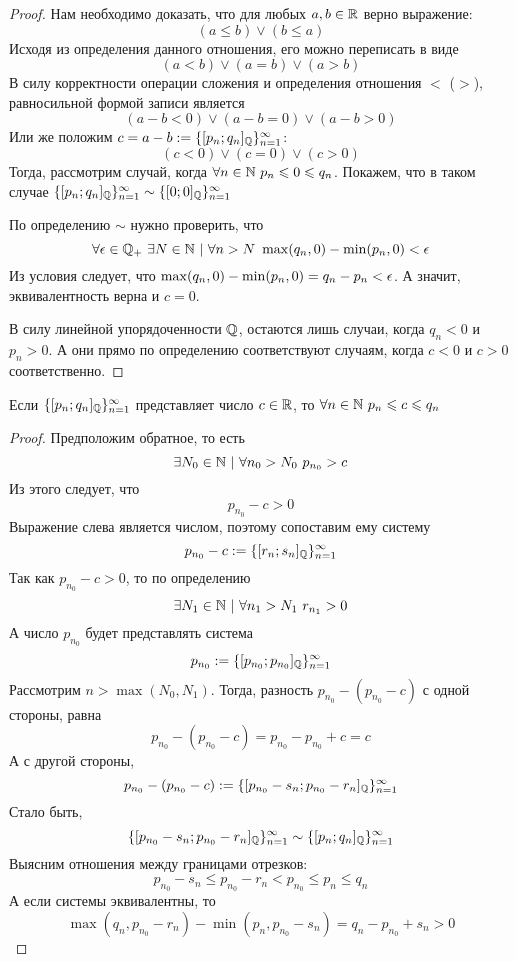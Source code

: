 \begin{proof}
    Нам необходимо доказать, что для любых $a, b \in \mathbb{R}$ верно выражение:
    $$
        (a \le b) \vee (b \le a)
    $$
    Исходя из определения данного отношения, его можно переписать в виде
    $$
        (a < b) \vee (a = b) \vee (a > b)
    $$
    В силу корректности операции сложения и определения отношения $<$ ($>$), равносильной формой записи является
    $$
        (a - b < 0) \vee (a - b = 0) \vee (a - b > 0)
    $$
    Или же положим $c = a - b := \{[p_n; q_n]_{\mathbb{Q}}\}_{n = 1}^\infty$:
    $$
        (c < 0) \vee (c = 0) \vee (c > 0)
    $$
    Тогда, рассмотрим случай, когда $\forall n \in \mathbb{N}\ p_n \leqslant 0 \leqslant q_n$.
    Покажем, что в таком случае $\{[p_n;q_n]_{\mathbb{Q}}\}_{n = 1}^\infty \sim \{[0;0]_{\mathbb{Q}}\}_{n = 1}^\infty$
    
    По определению $\sim$ нужно проверить, что
    $$
        \forall \epsilon \in \mathbb{Q}_+\ \exists N \in \mathbb{N}\ |\ \forall n > N\ \max(q_n, 0) - \min(p_n, 0) < \epsilon
    $$
    Из условия следует, что $\max(q_n, 0) - \min(p_n, 0) = q_n - p_n < \epsilon$. А значит, эквивалентность верна и $c = 0$.
    
    В силу линейной упорядоченности $\mathbb{Q}$, остаются лишь случаи, когда $q_n < 0$ и $p_n > 0$. А они прямо по определению соответствуют случаям, когда $c < 0$ и $c > 0$ соответственно.
\end{proof}

\begin{lemma}
    Если $\{[p_n; q_n]_{\mathbb{Q}}\}_{n = 1}^\infty$ представляет число $c \in \mathbb{R}$, то $\forall n \in \mathbb{N}\ p_n \leqslant c \leqslant q_n$
\end{lemma}

\begin{proof}
    Предположим обратное, то есть
    $$
        \exists N_0 \in \N\ |\ \forall n_0 > N_0\ p_{n_0} > c
    $$
    Из этого следует, что
    $$
        p_{n_0} - c > 0
    $$
    Выражение слева является числом, поэтому сопоставим ему систему
    $$
        p_{n_0} - c := \{[r_n; s_n]_{\mathbb{Q}}\}_{n = 1}^\infty
    $$
    Так как $p_{n_0} - c > 0$, то по определению
    $$
        \exists N_1 \in \N\ |\ \forall n_1 > N_1\ r_{n_1} > 0
    $$
    А число $p_{n_0}$ будет представлять система
    $$
        p_{n_0} := \{[p_{n_0}; p_{n_0}]_{\mathbb{Q}}\}_{n = 1}^\infty
    $$
    Рассмотрим $n > \max(N_0, N_1)$. Тогда, разность $p_{n_0} - (p_{n_0} - c)$ с одной стороны, равна
    $$
        p_{n_0} - (p_{n_0} - c) = p_{n_0} - p_{n_0} + c = c
    $$
    А с другой стороны,
    $$
        p_{n_0} - (p_{n_0} - c) := \{[p_{n_0} - s_n; p_{n_0} - r_n]_{\mathbb{Q}}\}_{n = 1}^\infty
    $$
    Стало быть,
    $$
        \{[p_{n_0} - s_n; p_{n_0} - r_n]_{\mathbb{Q}}\}_{n = 1}^\infty \sim \{[p_n; q_n]_{\mathbb{Q}}\}_{n = 1}^\infty
    $$
    Выясним отношения между границами отрезков:
    $$
        p_{n_0} - s_n \le p_{n_0} - r_n < p_{n_0} \le p_n \le q_n
    $$
    А если системы эквивалентны, то
    $$
        \max(q_n, p_{n_0} - r_n) - \min(p_n, p_{n_0} - s_n) = q_n - p_{n_0} + s_n > 0
    $$
\end{proof}


